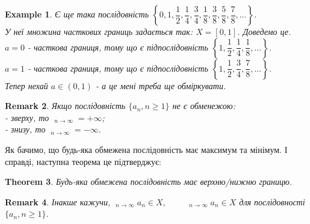 \documentclass[a4paper, 14pt]{article}
\DeclareMathOperator*\uplim{\overline{lim}}
\DeclareMathOperator*\downlim{\underline{lim}}
\theoremstyle{theoremdd}
\newtheorem{theorem}{Theorem}[subsection]
\theoremstyle{theoremdd}
\theoremstyle{theoremdd}
\theoremstyle{theoremdd}
\newtheorem{example}[theorem]{Example}
\theoremstyle{theoremdd}
\theoremstyle{theoremdd}
\newtheorem{remark}[theorem]{Remark}
\theoremstyle{theoremdd}
\theoremstyle{theoremdd}
\begin{document}
	\begin{example}
	Є ще така послідовність $\left\{ 0, 1, \dfrac{1}{2}, \dfrac{1}{4}, \dfrac{3}{4}, \dfrac{1}{8}, \dfrac{3}{8}, \dfrac{5}{8}, \dfrac{7}{8}, \dots \right\}$.\\
	У неї множина часткових границь задається так: $X = [0,1]$. Доведемо це.\\
	$a = 0$ - часткова границя, тому що є підпослідовність $\left\{ 1, \dfrac{1}{2}, \dfrac{1}{4}, \dfrac{1}{8}, \dots \right\}$.\\
	$a = 1$ - часткова границя, тому що є підпослідовність $\left\{ 1, \dfrac{1}{2}, \dfrac{3}{4}, \dfrac{7}{8}, \dots \right\}$.\\
	Тепер нехай $a \in (0,1)$ - \textit{а це мені треба ще обміркувати.}
	\end{example}
	
	\begin{remark}
	Якщо послідовність $\{a_n, n \geq 1\}$ не є обменежою:\\
	- зверху, то $\displaystyle \uplim_{n \to \infty} = +\infty$;\\
	- знизу, то $\displaystyle \downlim_{n \to \infty} = -\infty$.
	\end{remark}
	
	Як бачимо, що будь-яка обмежена послідовність має максимум та мінімум. І справді, наступна теорема це підтверджує:
	
	\begin{theorem}
	Будь-яка обмежена послідовність має верхню/нижню границю.
	\end{theorem}
	
	\begin{remark}
	Інакше кажучи, $\displaystyle \uplim_{n \to \infty} a_n \in X, \hspace{1cm} \downlim_{n \to \infty} a_n \in X$ для послідовності $\{a_n, n \geq 1\}$.
	\end{remark}
	
\end{document}
